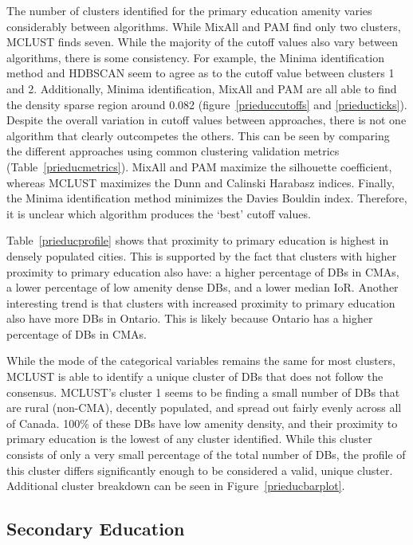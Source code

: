 \documentclass[11pt, a4paper]{article}
\begin{document}
The number of clusters identified for the primary education amenity varies considerably between algorithms. While MixAll and PAM find only two clusters, MCLUST finds seven. While the majority of the cutoff values also vary between algorithms, there is some consistency. For example, the Minima identification method and HDBSCAN seem to agree as to the cutoff value between clusters 1 and 2. Additionally, Minima identification, MixAll and PAM are all able to find the density sparse region around 0.082 (figure~\ref{prieduccutoffs} and \ref{prieducticks}). Despite the overall variation in cutoff values between approaches, there is not one algorithm that clearly outcompetes the others. This can be seen by comparing the different approaches using common clustering validation metrics (Table~\ref{prieducmetrics}). MixAll and PAM maximize the silhouette coefficient, whereas MCLUST maximizes the Dunn and Calinski Harabasz indices. Finally, the Minima identification method minimizes the Davies Bouldin index. Therefore, it is unclear which algorithm produces the `best' cutoff values.
\par
Table~\ref{prieducprofile} shows that proximity to primary education is highest in densely populated cities. This is supported by the fact that clusters with higher proximity to primary education also have: a higher percentage of DBs in CMAs, a lower percentage of low amenity dense DBs, and a lower median IoR. Another interesting trend is that clusters with increased proximity to primary education also have more DBs in Ontario. This is likely because Ontario has a higher percentage of DBs in CMAs.
\par
While the mode of the categorical variables remains the same for most clusters, MCLUST is able to identify a unique cluster of DBs that does not follow the consensus. MCLUST’s cluster 1 seems to be finding a small number of DBs that are rural (non-CMA), decently populated, and spread out fairly evenly across all of Canada. 100\% of these DBs have low amenity density, and their proximity to primary education is the lowest of any cluster identified. While this cluster consists of only a very small percentage of the total number of DBs, the profile of this cluster differs significantly enough to be considered a valid, unique cluster. Additional cluster breakdown can be seen in Figure~\ref{prieducbarplot}.








\justifying
\subsection{Secondary Education}
\end{document}
